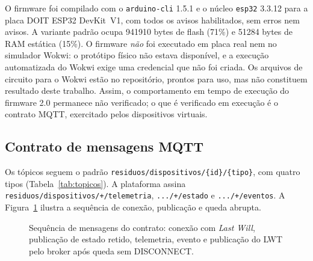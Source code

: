 O firmware foi compilado com o \texttt{arduino-cli} 1.5.1 e o núcleo
\texttt{esp32} 3.3.12 para a placa DOIT ESP32 DevKit~V1, com todos os avisos
habilitados, sem erros nem avisos. A variante padrão ocupa \num{941910} bytes
de flash (71\%) e \num{51284} bytes de RAM estática (15\%). O firmware
\emph{não} foi executado em placa real nem no simulador Wokwi: o protótipo
físico não estava disponível, e a execução automatizada do Wokwi exige uma
credencial que não foi criada. Os arquivos de circuito para o Wokwi estão no
repositório, prontos para uso, mas não constituem resultado deste trabalho.
Assim, o comportamento em tempo de execução do firmware 2.0 permanece não
verificado; o que é verificado em execução é o contrato MQTT, exercitado pelos
dispositivos virtuais.

\subsection{Contrato de mensagens MQTT}

Os tópicos seguem o padrão \texttt{residuos/dispositivos/\{id\}/\{tipo\}}, com
quatro tipos (Tabela~\ref{tab:topicos}). A plataforma assina
\texttt{residuos/dispositivos/+/telemetria}, \texttt{.../+/estado} e
\texttt{.../+/eventos}. A Figura~\ref{fig:mqtt_seq} ilustra a sequência de
conexão, publicação e queda abrupta.

\begin{table}[ht]
\centering
\caption{Tópicos do contrato MQTT (esquema versão 1).}
\label{tab:topicos}
\footnotesize
{}
\end{table}

\begin{figure}[ht]
  \centering
  \resizebox{\textwidth}{!}{}
  \caption{Sequência de mensagens do contrato: conexão com \emph{Last Will}, publicação de estado retido, telemetria, evento e publicação do LWT pelo broker após queda sem DISCONNECT.}
  \label{fig:mqtt_seq}
\end{figure}

